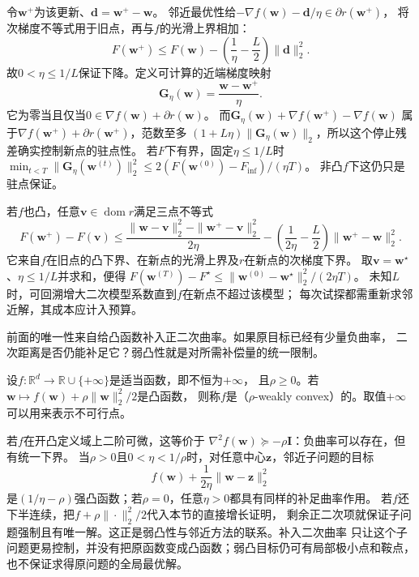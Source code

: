 令$\bm w^+$为该更新、$\bm d=\bm w^+-\bm w$。
邻近最优性给$-\nabla f(\bm w)-\bm d/\eta\in\partial r(\bm w^+)$，
将次梯度不等式用于旧点，再与$f$的光滑上界相加：
\begin{equation}
 F(\bm w^+)\leq F(\bm w)
 -\left(\frac1\eta-\frac L2\right)\|\bm d\|_2^2.
 \label{eq:opt-proximal-gradient-descent}
\end{equation}
故$0<\eta\leq1/L$保证下降。定义可计算的近端梯度映射
\[
 \bm G_\eta(\bm w)=\frac{\bm w-\bm w^+}{\eta}.
\]
它为零当且仅当$0\in\nabla f(\bm w)+\partial r(\bm w)$。
而$\bm G_\eta(\bm w)+\nabla f(\bm w^+)-\nabla f(\bm w)$
属于$\nabla f(\bm w^+)+\partial r(\bm w^+)$，范数至多
$(1+L\eta)\|\bm G_\eta(\bm w)\|_2$，所以这个停止残差确实控制新点的驻点性。
若$F$下有界，固定$\eta\leq1/L$时
$\min_{t<T}\|\bm G_\eta(\bm w^{(t)})\|_2^2
\leq2(F(\bm w^{(0)})-F_{\inf})/(\eta T)$。
非凸$f$下这仍只是驻点保证。

若$f$也凸，任意$\bm v\in\operatorname{dom}r$满足三点不等式
\[
 F(\bm w^+)-F(\bm v)
 \leq\frac{\|\bm w-\bm v\|_2^2-\|\bm w^+-\bm v\|_2^2}{2\eta}
 -\left(\frac1{2\eta}-\frac L2\right)\|\bm w^+-\bm w\|_2^2.
\]
它来自$f$在旧点的凸下界、在新点的光滑上界及$r$在新点的次梯度下界。
取$\bm v=\bm w^\star$、$\eta\leq1/L$并求和，便得
$F(\bm w^{(T)})-F^\star\leq\|\bm w^{(0)}-\bm w^\star\|_2^2/(2\eta T)$。
未知$L$时，可回溯增大二次模型系数直到$f$在新点不超过该模型；
每次试探都需重新求邻近解，其成本应计入预算。

前面的唯一性来自给凸函数补入正二次曲率。如果原目标已经有少量负曲率，
二次距离是否仍能补足它？弱凸性就是对所需补偿量的统一限制。
\begin{definition}[欧氏空间中的弱凸性]
\label{def:opt-weak-convexity}
设$f:\mathbb{R}^d\to\mathbb{R}\cup\{+\infty\}$是适当函数，即不恒为$+\infty$，
且$\rho\geq0$。若
$\bm{w}\mapsto f(\bm{w})+\rho\lVert\bm{w}\rVert_2^2/2$是凸函数，
则称$f$是（$\rho$-weakly convex）的。取值$+\infty$可以用来表示不可行点。
\end{definition}
若$f$在开凸定义域上二阶可微，这等价于
$\nabla^2f(\bm{w})\succeq-\rho\bm{I}$：负曲率可以存在，但有统一下界。
当$\rho>0$且$0<\eta<1/\rho$时，对任意中心$\bm{z}$，邻近子问题的目标
\[
  f(\bm{w})+\frac{1}{2\eta}\lVert\bm{w}-\bm{z}\rVert_2^2
\]
是$(1/\eta-\rho)$强凸函数；若$\rho=0$，任意$\eta>0$都具有同样的补足曲率作用。
若$f$还下半连续，把$f+\rho\|\cdot\|_2^2/2$代入本节的直接增长证明，
剩余正二次项就保证子问题强制且有唯一解。这正是弱凸性与邻近方法的联系。补入二次曲率
只让这个子问题更易控制，并没有把原函数变成凸函数；弱凸目标仍可有局部极小点和鞍点，
也不保证求得原问题的全局最优解。

